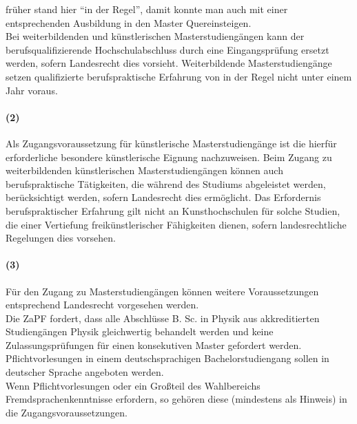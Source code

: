 \documentclass[a4paper]{scrartcl}
\begin{document}
\textcolor{Bernd}{\textbf{\cite{POS: WiSe2017-AkkRL}} früher stand hier \enquote{in der Regel}, damit konnte man auch mit einer entsprechenden Ausbildung in den Master Quereinsteigen.}\\

Bei weiterbildenden und künstlerischen Masterstudiengängen kann der berufsqualifizierende Hochschulabschluss durch eine Eingangsprüfung ersetzt werden, sofern Landesrecht dies vorsieht. Weiterbildende Masterstudiengänge setzen qualifizierte berufspraktische Erfahrung von in der Regel nicht unter einem Jahr voraus.

\paragraph{(2)} Als Zugangsvoraussetzung für künstlerische Masterstudiengänge ist die hierfür erforderliche besondere künstlerische Eignung nachzuweisen. Beim Zugang zu weiterbildenden künstlerischen Masterstudiengängen können auch berufspraktische Tätigkeiten, die während des Studiums abgeleistet werden, berücksichtigt werden, sofern Landesrecht dies ermöglicht. Das Erfordernis berufspraktischer Erfahrung gilt nicht an Kunsthochschulen für solche Studien, die einer Vertiefung freikünstlerischer Fähigkeiten dienen, sofern landesrechtliche Regelungen dies vorsehen.
\paragraph{(3)} Für den Zugang zu Masterstudiengängen können weitere
Voraussetzungen entsprechend Landesrecht vorgesehen werden.\\

\textcolor{Bernd}{\textbf{\cite{RESO: SoSe2008-MaZu}} Die ZaPF fordert, dass alle Abschlüsse B. Sc. in Physik aus akkreditierten Studiengängen Physik gleichwertig behandelt werden und keine Zulassungsprüfungen für einen konsekutiven Master gefordert werden.}\\

\textcolor{Bernd}{\textbf{\cite{RESO: WiSe2008-RL}} Pflichtvorlesungen in einem deutschsprachigen Bachelorstudiengang sollen in deutscher Sprache angeboten werden.}\\

\textcolor{Bernd}{\textbf{\cite{RESO: WiSe2008-RL}} Wenn Pflichtvorlesungen oder ein Großteil des Wahlbereichs Fremdsprachenkenntnisse erfordern, so gehören diese (mindestens als Hinweis) in die Zugangsvoraussetzungen.}\\
\end{document}
